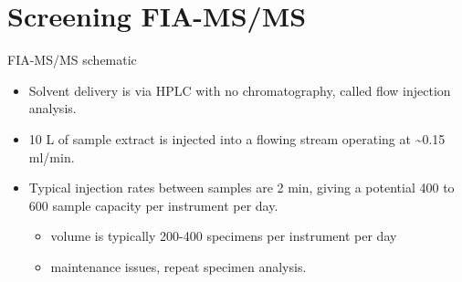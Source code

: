 \documentclass[presentation, smaller]{beamer}
\begin{document}
\section{Screening FIA-MS/MS}
\label{sec:orgheadline14}
\begin{frame}[label={sec:orgheadline8}]{FIA-MS/MS schematic}
\begin{center}
\end{center}

\begin{itemize}
\item Solvent delivery is via HPLC with no chromatography, called flow injection analysis.
\item 10 \textmu{}L of sample extract is injected into a flowing stream operating at \textasciitilde{}0.15 ml/min.

\item Typical injection rates between samples are 2 min, giving a potential 400
to 600 sample capacity per instrument per day.
\begin{itemize}
\item volume is typically 200-400 specimens per instrument per day
\item maintenance issues, repeat specimen analysis.
\end{itemize}
\end{itemize}
\end{frame}
\end{document}
